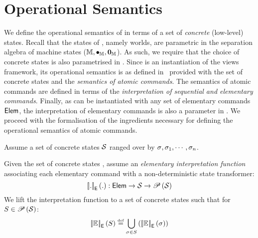 \section{Operational Semantics}\label{subsec:op-sem}
We define the operational semantics of \colosl in terms of a set of \emph{concrete} (low-level) states. Recall that the states of \colosl, namely worlds, are parametric in the separation algebra of machine states ($\mathbb{M}, \bullet_{\mathbb{M}}, \mathbf{0}_{\mathbb{M}}$). As such, we require that the choice of concrete states is also parametrised in \colosl.
Since \colosl is an instantiation of the views framework, its operational semantics is as defined in~\cite{views} provided with the set of concrete states and the \emph{semantics of atomic commands}.
The semantics of atomic commands are defined in terms of the \emph{interpretation of sequential and elementary commands}. Finally, as \colosl can be instantiated with any set of elementary commands $\textsf{Elem}$, the interpretation of elementary commands is also a parameter in \colosl. We proceed with the formalisation of the ingredients necessary for defining the operational semantics of atomic commands.
%
\begin{parameter}
%
Assume a set of concrete states $\mathcal{S}$ ranged over by $\sigma_{}, \sigma_{1}, \cdots, \sigma_{n}$. 
%
\end{parameter}
%
\begin{parameter}\label{par:basicSoundness}
Given the set of concrete states \MStates, assume an \emph{elementary interpretation function} associating each elementary command with a non-deterministic state transformer:
%
\[
	\left[\!\left| . \right |\! \right]_{\textsf{E}}\left( . \right) : \textsf{Elem} \rightarrow \mathcal{S} \rightarrow \mathscr{P}\left(\mathcal{S} \right)
\]
%
We lift the interpretation function to a set of concrete states such that for $S \in \mathscr{P}\left(\mathcal{S} \right)$:
%
\[
	\left[\!\left| \mathbb{E}_{} \right |\! \right]_{\textsf{E}}\left( S \right) \mathrel{\stackrel{\smash{\scriptscriptstyle{\mathrm{def}}}}{=}} \bigcup\limits_{\sigma_{} \in S} \left( \left[\!\left| \mathbb{E}_{} \right |\! \right]_{\textsf{E}}\left( \sigma_{} \right)\right)
\]
%
\end{parameter}
%
%

